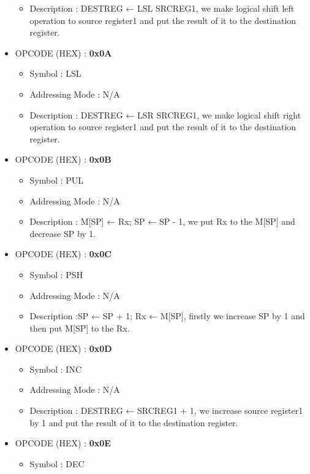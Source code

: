 \documentclass[pdftex,12pt,a4paper]{article}
\begin{document}
\begin{itemize}
\begin{itemize}
            \item Description : DESTREG ← LSL SRCREG1, we make logical shift left operation to source register1 and put the result of it to  the destination register.
        \end{itemize}    
    \item OPCODE (HEX) : \textbf{0x0A}
        \begin{itemize}
            \item Symbol : LSL
            \item Addressing Mode : N/A
            \item Description : DESTREG ← LSR SRCREG1, we make logical shift right operation to source register1 and put the result of it to  the destination register.
        \end{itemize}    
    \item OPCODE (HEX) : \textbf{0x0B}
        \begin{itemize}
            \item Symbol : PUL 
            \item Addressing Mode : N/A
            \item Description : M[SP] ← Rx; SP ← SP - 1, we put Rx to the M[SP] and decrease SP by 1.
        \end{itemize}    
    \item OPCODE (HEX) : \textbf{0x0C}  
        \begin{itemize}
            \item Symbol : PSH
            \item Addressing Mode : N/A
            \item Description :SP ← SP + 1; Rx ← M[SP], firstly we increase SP by 1 and then put M[SP] to the Rx.
        \end{itemize}    
    \item OPCODE (HEX) : \textbf{0x0D}
        \begin{itemize}
            \item Symbol : INC
            \item Addressing Mode : N/A
            \item Description : DESTREG ← SRCREG1 + 1, we increase source register1 by 1 and put the result of it to  the destination register.
        \end{itemize}    
    \item OPCODE (HEX) : \textbf{0x0E}
        \begin{itemize}
            \item Symbol : DEC

\end{itemize}
\end{itemize}
\end{document}
